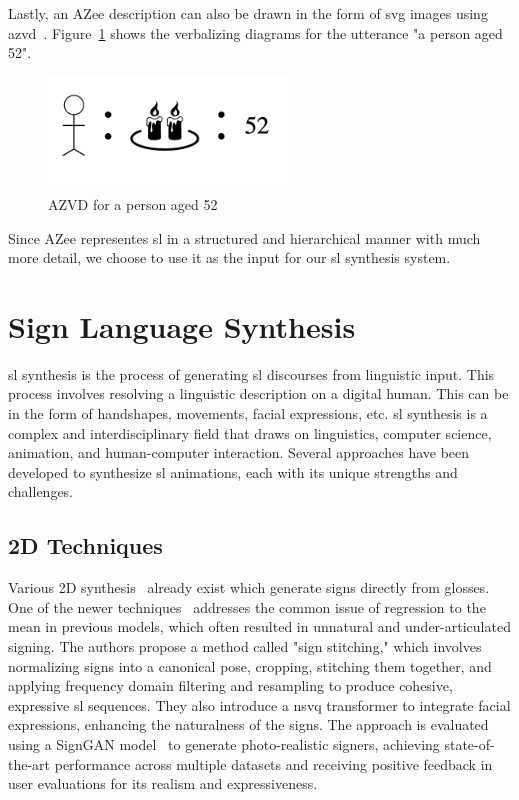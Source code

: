 \documentclass[../../main.tex]{subfiles}
\begin{document}
Lastly, an AZee description can also be drawn in the form of \gls{svg} images using \gls{azvd}~\cite{filhol2024software}. Figure~\ref{fig:azvd} shows the verbalizing diagrams for the \gls{utterance} "a person aged 52".

\begin{figure}
  \centering \includegraphics[width = 2.5in]{chapters/background_work/images/azvd.png}
  \caption{AZVD for a person aged 52}
  \label{fig:azvd}
\end{figure}

Since AZee representes \gls{sl} in a structured and hierarchical manner with much more detail, we choose to use it as the input for our \gls{sl} synthesis system.

\section{Sign Language Synthesis}
\label{ch:background_work:sign_language_synthesis}

\gls{sl} synthesis is the process of generating \gls{sl} discourses from linguistic input. This process involves resolving a linguistic description on a digital human. This can be in the form of handshapes, movements, facial expressions, etc. \gls{sl} synthesis is a complex and interdisciplinary field that draws on linguistics, computer science, animation, and human-computer interaction. Several approaches have been developed to synthesize \gls{sl} animations, each with its unique strengths and challenges.

\subsection{2D Techniques}
\label{ch:background_work:sign_language_synthesis:2d_techniques}

Various 2D synthesis~\cite{jiang2024signclipconnectingtextsign, moryossef2024signmtrealtimemultilingualsign} already exist which generate signs directly from \gls{glosses}. One of the newer techniques~\cite{walsh2024sign} addresses the common issue of regression to the mean in previous models, which often resulted in unnatural and under-articulated signing. The authors propose a method called "sign stitching," which involves normalizing signs into a canonical pose, cropping, stitching them together, and applying frequency domain filtering and resampling to produce cohesive, expressive \gls{sl} sequences. They also introduce a \gls{nsvq} transformer to integrate facial expressions, enhancing the naturalness of the signs. The approach is evaluated using a SignGAN model~\cite{saunders2020everybodysignnowtranslating} to generate photo-realistic signers, achieving state-of-the-art performance across multiple datasets and receiving positive feedback in user evaluations for its realism and expressiveness.
\end{document}
